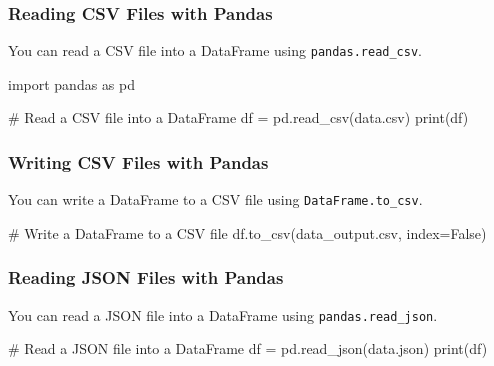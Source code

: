 \documentclass[
  letterpaper,
  DIV=11,
  numbers=noendperiod]{scrreprt}
\newenvironment{Shaded}{\begin{snugshade}}{\end{snugshade}}
\newcommand{\BuiltInTok}[1]{\textcolor[rgb]{0.00,0.23,0.31}{#1}}
\newcommand{\CommentTok}[1]{\textcolor[rgb]{0.37,0.37,0.37}{#1}}
\newcommand{\ImportTok}[1]{\textcolor[rgb]{0.00,0.46,0.62}{#1}}
\newcommand{\NormalTok}[1]{\textcolor[rgb]{0.00,0.23,0.31}{#1}}
\newcommand{\OperatorTok}[1]{\textcolor[rgb]{0.37,0.37,0.37}{#1}}
\newcommand{\StringTok}[1]{\textcolor[rgb]{0.13,0.47,0.30}{#1}}
\newcommand{\VariableTok}[1]{\textcolor[rgb]{0.07,0.07,0.07}{#1}}
\begin{document}
\subsubsection{Reading CSV Files with
Pandas}\label{reading-csv-files-with-pandas}

You can read a CSV file into a DataFrame using
\texttt{pandas.read\_csv}.

\begin{Shaded}
\begin{Highlighting}[]
\ImportTok{import}\NormalTok{ pandas }\ImportTok{as}\NormalTok{ pd}

\CommentTok{\# Read a CSV file into a DataFrame}
\NormalTok{df }\OperatorTok{=}\NormalTok{ pd.read\_csv(}\StringTok{\textquotesingle{}data.csv\textquotesingle{}}\NormalTok{)}
\BuiltInTok{print}\NormalTok{(df)}
\end{Highlighting}
\end{Shaded}

\subsubsection{Writing CSV Files with
Pandas}\label{writing-csv-files-with-pandas}

You can write a DataFrame to a CSV file using
\texttt{DataFrame.to\_csv}.

\begin{Shaded}
\begin{Highlighting}[]
\CommentTok{\# Write a DataFrame to a CSV file}
\NormalTok{df.to\_csv(}\StringTok{\textquotesingle{}data\_output.csv\textquotesingle{}}\NormalTok{, index}\OperatorTok{=}\VariableTok{False}\NormalTok{)}
\end{Highlighting}
\end{Shaded}

\subsubsection{Reading JSON Files with
Pandas}\label{reading-json-files-with-pandas}

You can read a JSON file into a DataFrame using
\texttt{pandas.read\_json}.

\begin{Shaded}
\begin{Highlighting}[]
\CommentTok{\# Read a JSON file into a DataFrame}
\NormalTok{df }\OperatorTok{=}\NormalTok{ pd.read\_json(}\StringTok{\textquotesingle{}data.json\textquotesingle{}}\NormalTok{)}
\BuiltInTok{print}\NormalTok{(df)}
\end{Highlighting}
\end{Shaded}
\end{document}
